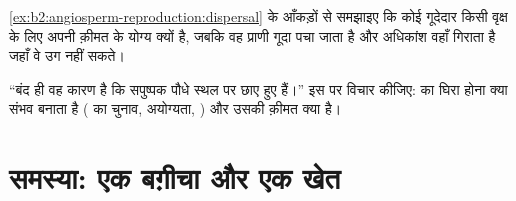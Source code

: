 \begin{exercise}[$\star\star\star$]\label{exo:b2:angiosperm-reproduction:11}
\cref{ex:b2:angiosperm-reproduction:dispersal} के आँकड़ों से समझाइए कि
कोई गूदेदार  किसी वृक्ष के लिए अपनी क़ीमत के योग्य क्यों है, जबकि वह
प्राणी गूदा पचा जाता है और अधिकांश  वहाँ गिराता है जहाँ वे उग नहीं
सकते।
\end{exercise}

\begin{exercise}[$\star\star\star$]\label{exo:b2:angiosperm-reproduction:12}
``बंद  ही वह कारण है कि सपुष्पक पौधे स्थल पर छाए हुए हैं।''
इस पर विचार कीजिए:  का घिरा होना क्या संभव बनाता है
( का चुनाव, अयोग्यता, ) और उसकी क़ीमत क्या है।
\end{exercise}

\section{समस्या: एक बग़ीचा और एक खेत}

